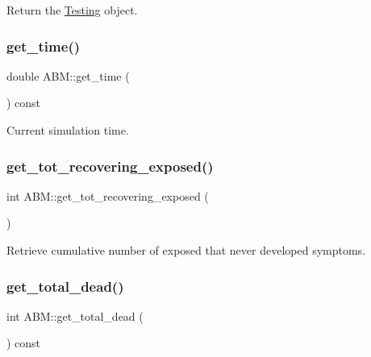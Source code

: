 Return the \hyperlink{classTesting}{Testing} object. 

\mbox{\label{classABM_a8a409f2ed07df42b316bcc2d4bb37340}} 
\subsubsection{\texorpdfstring{get\+\_\+time()}{get\_time()}}
{\footnotesize\ttfamily double A\+B\+M\+::get\+\_\+time (\begin{DoxyParamCaption}{ }\end{DoxyParamCaption}) const\hspace{0.3cm}{\ttfamily [inline]}}



Current simulation time. 

\mbox{\label{classABM_ae43e8808cb028d7a18841a66a9070937}} 
\subsubsection{\texorpdfstring{get\+\_\+tot\+\_\+recovering\+\_\+exposed()}{get\_tot\_recovering\_exposed()}}
{\footnotesize\ttfamily int A\+B\+M\+::get\+\_\+tot\+\_\+recovering\+\_\+exposed (\begin{DoxyParamCaption}{ }\end{DoxyParamCaption})\hspace{0.3cm}{\ttfamily [inline]}}



Retrieve cumulative number of exposed that never developed symptoms. 

\mbox{\label{classABM_ad6d901acab9e9b92a0c992009ec51680}} 
\subsubsection{\texorpdfstring{get\+\_\+total\+\_\+dead()}{get\_total\_dead()}}
{\footnotesize\ttfamily int A\+B\+M\+::get\+\_\+total\+\_\+dead (\begin{DoxyParamCaption}{ }\end{DoxyParamCaption}) const\hspace{0.3cm}{\ttfamily [inline]}}



